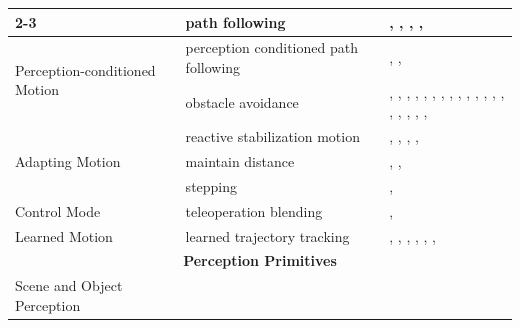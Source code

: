 \begin{table}[!h]
\begin{tabular}{|p{4cm}|p{5cm}|p{15cm}|}
\cline{2-3}
    & path following                        & \cite{Arrais2019ApplicationOT}, \cite{Forster2020AutomaticEO}, \cite{Youngquist2022EvaluatingSA}, \cite{Tsay2010MaterialHO}, \cite{Zsoldos2025TowardsRL} \\
\hline
\multirow{2}{*}{\parbox{4cm}{Perception-conditioned Motion}}
    & perception conditioned path following & \cite{Arrais2019ApplicationOT}, \cite{Andersen2017IntegrationOA}, \cite{Waarsing2001IntroducingRI} \\
\cline{2-3}
    & obstacle avoidance                    & \cite{Forster2020AutomaticEO}, \cite{Bruemmer2010BehaviorBC}, \cite{Sayyaadi2014ControlON}, \cite{Stckler2013IncreasingFO}, \cite{Stckler2009IntegratingIM}, \cite{Tsay2010MaterialHO}, \cite{Lee2018PlanningAC}, \cite{Lin2010ResearchOO}, \cite{Hentout2008MultiagentAM}, \cite{Chang2006ABB}, \cite{Chang2006AnalysisOA}, \cite{MacKenzie1996BehaviorbasedMM}, \cite{Hentout2007BehaviourbasedAF}, \cite{Sequeira2000BehaviourbasedCB}, \cite{Nagatani1996DesigningSA}, \cite{Nagatani1996DooropeningBO}, \cite{Andrian2005EmbeddedCI}, \cite{Waarsing2001IntroducingRI}, \cite{Pimentel2002OnTD}, \cite{Qin2022LearningFH} \\
\hline
\multirow{3}{*}{\parbox{3cm}{Adapting Motion}}
    & reactive stabilization motion         & \cite{Mitrevski2019LucyTT}, \cite{Huang2013BehaviorB}, \cite{Schwarz2016HybridDL}, \cite{Klamt2018SupervisedAL}, \cite{Thakar2018TowardsTT} \\
\cline{2-3}
    & maintain distance                     & \cite{Lee2018PlanningAC}, \cite{Nagatani1996DesigningSA}, \cite{Nagatani1996DooropeningBO} \\
\cline{2-3}
    & stepping                              & \cite{Schwarz2016HybridDL}, \cite{Klamt2018SupervisedAL} \\
\hline
\multirow{1}{*}{\parbox{2cm}{Control Mode}}
    & teleoperation blending                & \cite{Maeda2022BlendingPP}, \cite{Klamt2018SupervisedAL} \\
\hline
\multirow{1}{*}{\parbox{3cm}{Learned Motion}}
    & learned trajectory tracking           & \cite{Zhao2025ACL}, \cite{Schmalstieg2023LearningHI}, \cite{Zhao2025ReactiveWL}, \cite{Deng2017ReinforcementLO}, \cite{Li2017ReinforcementLO}, \cite{Kiyokawa2025SelfSupervisedLO}, \cite{Qin2022LearningFH} \\
\hline
\multicolumn{3}{|c|}{\textbf{Perception Primitives}} \\
\hline
\multirow{4}{*}{\parbox{4cm}{Scene and Object Perception}}

\end{tabular}
\end{table}
